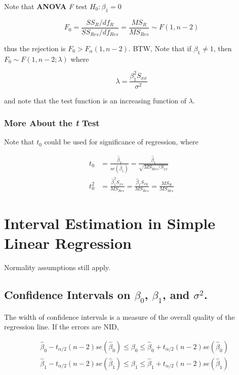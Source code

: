 \documentclass[12pt]{article}
\begin{document}
Note that \textbf{ANOVA} \textit{F} test $H_0 : \beta_1 = 0$

$$
F_0 = \frac{SS_{R}/df_R}{SS_{Res}/df_{Res}} = \frac{MS_R}{MS_{Res}} \sim F(1, n-2)
$$

thus the rejection is $F_0 > F_{\alpha}(1, n-2)$. BTW, Note that if $\beta_1 \neq 1$, then $F_0 \sim F(1, n-2 ; \lambda)$ where

$$
\lambda = \frac{\beta_1^2 S_{xx}}{\sigma^2}
$$

and note that the test function is an increasing function of $\lambda$.


\subsubsection*{More About the \textit{t} Test}

Note that $t_0$ could be used for significance of regression, where

$$
\begin{aligned}
t_0 &= \frac{\hat{\beta}_1}{se \left( \hat{\beta}_1 \right)} = \frac{\hat{\beta}_1}{\sqrt{MS_{Res} / S_{xx}}} \\[10pt]
t_0^2 &= \frac{\hat{\beta}_1^2 S_{xx}}{MS_{Res}} = \frac{\hat{\beta}_1 S_{xy}}{MS_{Res}} = \frac{MS_R}{MS_{Res}} 
\end{aligned}
$$


\pagebreak

\section{Interval Estimation in Simple Linear Regression} 


Normality assumptions still apply.


\subsection{Confidence Intervals on $\beta_0$, $\beta_1$, and $\sigma^2$.} 

The width of confidence intervals is a measure of the overall quality of the regression line. If the errors are NID, 

$$
\begin{aligned}
&\hat{\beta}_0 - t_{\alpha/2}(n-2) se \left( \hat{\beta}_0 \right) \le \beta_0 \le \hat{\beta}_0 + t_{\alpha/2}(n-2) se \left( \hat{\beta}_0 \right) \\[10pt]
&\hat{\beta}_1 - t_{\alpha/2}(n-2) se \left( \hat{\beta}_1 \right) \le \beta_1 \le \hat{\beta}_1 + t_{\alpha/2}(n-2) se \left( \hat{\beta}_1 \right) \\[10pt]
\end{aligned}
$$
\end{document}
